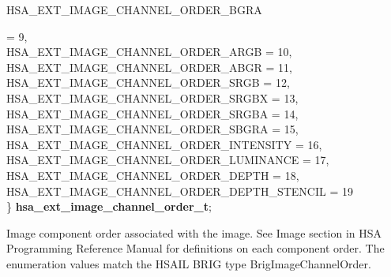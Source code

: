 \documentclass[final]{book}
\newcommand{\reftyp}[1]{#1}
\newcommand{\refenu}[1]{\reftyp{#1}}
\newenvironment{mylongtable}{\rowcolors{0}{lightgray}{lightgray}\longtable} {
\endlongtable}
\begin{document}
\begin{mylongtable}{@{}p{\textwidth}}
\hspace{1.7em}\hypertarget{group__ext-images_1ggabaced4fb1f3b9fdaa978e143af5ff055a8f8724381ae9dfe592a15808ebe8c1d2}{\refenu{HSA_\-EXT_\-IMAGE_\-CHANNEL_\-ORDER_\-BGRA}} = 9,\\
\hspace{1.7em}\hypertarget{group__ext-images_1ggabaced4fb1f3b9fdaa978e143af5ff055a7a49085ae07e467293c0a10d003a2356}{\refenu{HSA_\-EXT_\-IMAGE_\-CHANNEL_\-ORDER_\-ARGB}} = 10,\\
\hspace{1.7em}\hypertarget{group__ext-images_1ggabaced4fb1f3b9fdaa978e143af5ff055a8fd833428ebe3e1428e0001115ec6880}{\refenu{HSA_\-EXT_\-IMAGE_\-CHANNEL_\-ORDER_\-ABGR}} = 11,\\
\hspace{1.7em}\hypertarget{group__ext-images_1ggabaced4fb1f3b9fdaa978e143af5ff055a64dbb297ed7cf48f525ffe32aa653319}{\refenu{HSA_\-EXT_\-IMAGE_\-CHANNEL_\-ORDER_\-SRGB}} = 12,\\
\hspace{1.7em}\hypertarget{group__ext-images_1ggabaced4fb1f3b9fdaa978e143af5ff055a38d8f1c70900f6646df6a6d20746f840}{\refenu{HSA_\-EXT_\-IMAGE_\-CHANNEL_\-ORDER_\-SRGBX}} = 13,\\
\hspace{1.7em}\hypertarget{group__ext-images_1ggabaced4fb1f3b9fdaa978e143af5ff055ae9980a3013f42e7d56f4fd28ea8c3b7c}{\refenu{HSA_\-EXT_\-IMAGE_\-CHANNEL_\-ORDER_\-SRGBA}} = 14,\\
\hspace{1.7em}\hypertarget{group__ext-images_1ggabaced4fb1f3b9fdaa978e143af5ff055a2617e3d26bbf6dd3c136534dcf5e4594}{\refenu{HSA_\-EXT_\-IMAGE_\-CHANNEL_\-ORDER_\-SBGRA}} = 15,\\
\hspace{1.7em}\hypertarget{group__ext-images_1ggabaced4fb1f3b9fdaa978e143af5ff055a5fb131f53f229f55456287a009da9b6e}{\refenu{HSA_\-EXT_\-IMAGE_\-CHANNEL_\-ORDER_\-INTENSITY}} = 16,\\
\hspace{1.7em}\hypertarget{group__ext-images_1ggabaced4fb1f3b9fdaa978e143af5ff055a5576d6ae7fd07c21fa8196c4323f1476}{\refenu{HSA_\-EXT_\-IMAGE_\-CHANNEL_\-ORDER_\-LUMINANCE}} = 17,\\
\hspace{1.7em}\hypertarget{group__ext-images_1ggabaced4fb1f3b9fdaa978e143af5ff055ad26aef84eb00f1d1e9defc45f7508e50}{\refenu{HSA_\-EXT_\-IMAGE_\-CHANNEL_\-ORDER_\-DEPTH}} = 18,\\
\hspace{1.7em}\hypertarget{group__ext-images_1ggabaced4fb1f3b9fdaa978e143af5ff055aa1c158a53efa2619ceefa748f3d99a99}{\refenu{HSA_\-EXT_\-IMAGE_\-CHANNEL_\-ORDER_\-DEPTH_\-STENCIL}} = 19\\
\} \hypertarget{group__ext-images_1gabaced4fb1f3b9fdaa978e143af5ff055}{\textbf{hsa_\-ext_\-image_\-channel_\-order_\-t}};\rule[-2ex]{0pt}{0pt}\end{mylongtable}
\vspace{-2mm}Image component order associated with the image. See Image section in HSA Programming Reference Manual for definitions on each component order. The enumeration values match the HSAIL BRIG type BrigImageChannelOrder.
\end{document}
